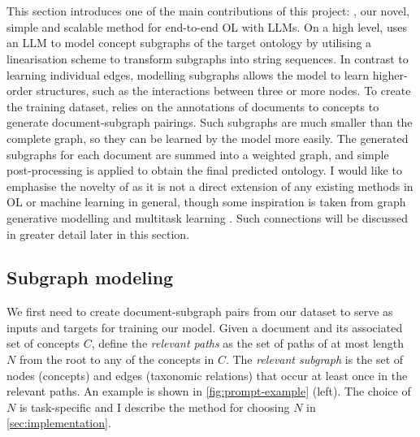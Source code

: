 

\section{\name}  \label{sec:implementation:core}

This section introduces one of the main contributions of this project: \name, our novel, simple and scalable method for end-to-end OL with LLMs. On a high level, \name uses an LLM to model concept subgraphs of the target ontology by utilising a linearisation scheme to transform subgraphs into string sequences. In contrast to learning individual edges, modelling subgraphs allows the model to learn higher-order structures, such as the interactions between three or more nodes. To create the training dataset, \name relies on the annotations of documents to concepts to generate document-subgraph pairings. Such subgraphs are much smaller than the complete graph, so they can be learned by the model more easily. The generated subgraphs for each document are summed into a weighted graph, and simple post-processing is applied to obtain the final predicted ontology. I would like to emphasise the novelty of \name as it is not a direct extension of any existing methods in OL or machine learning in general, though some inspiration is taken from graph generative modelling \cite{li2018learning} and multitask learning \cite{caruana1997multitask}. Such connections will be discussed in greater detail later in this section.

\subsection{Subgraph modeling}  \label{sec:method:subgraph}



We first need to create document-subgraph pairs from our dataset to serve as inputs and targets for training our model. Given a document and its associated set of concepts $C$, define the \emph{relevant paths} as the set of paths of at most length $N$ from the root to any of the concepts in $C$. The \emph{relevant subgraph} is the set of nodes (concepts) and edges (taxonomic relations) that occur at least once in the relevant paths. An example is shown in \cref{fig:prompt-example} (left). The choice of $N$ is task-specific and I describe the method for choosing $N$ in \cref{sec:implementation}.

